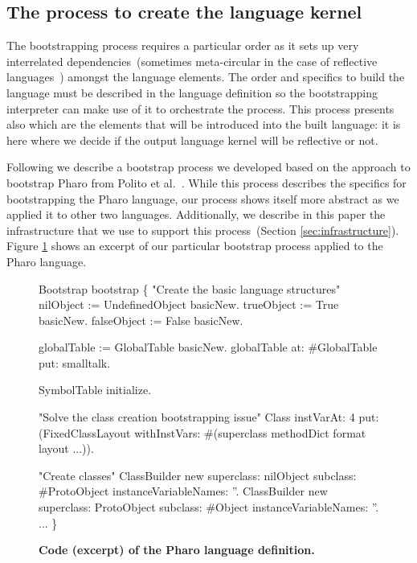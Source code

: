 %

\subsection{The process to create the language kernel}
The bootstrapping process requires a particular order as it sets up very interrelated dependencies~(sometimes meta-circular in the case of reflective languages~\cite{Stra14a,Chib96a,Maes87a,Smit84a}) amongst the language elements. The order and specifics to build the language must be described in the language definition so the bootstrapping interpreter can make use of it to orchestrate the process. This process presents also which are the elements that will be introduced into the built language: it is here where we decide if the output language kernel will be reflective or not.

Following we describe a bootstrap process we developed based on the approach to bootstrap Pharo from Polito et al.~\cite{Poli14c}. While this process describes the specifics for bootstrapping the Pharo language, our process shows itself more abstract as we applied it to other two languages. Additionally, we describe in this paper the infrastructure that we use to support this process~(Section \ref{sec:infrastructure}). Figure \ref{code:process} shows an excerpt of our particular bootstrap process applied to the Pharo language.

\begin{figure}[ht]
\begin{code}
Bootstrap bootstrap \{
    "Create the basic language structures"
    nilObject := UndefinedObject basicNew.
    trueObject := True basicNew.
    falseObject := False basicNew.
    
    globalTable := GlobalTable basicNew.
    globalTable at: #GlobalTable put: smalltalk.
    
    SymbolTable initialize.
    
    "Solve the class creation bootstrapping issue"
    Class
        instVarAt: 4
        put: (FixedClassLayout
            withInstVars: #(superclass methodDict format layout ...)).
    
    "Create classes"
    ClassBuilder new
        superclass: nilObject
        subclass: #ProtoObject
        instanceVariableNames: ''.
    ClassBuilder new
        superclass: ProtoObject
        subclass: #Object
        instanceVariableNames: ''.
    ...
\}
\end{code}
\caption{\textbf{Code (excerpt) of the Pharo language definition.}\label{code:process}}
\end{figure}

